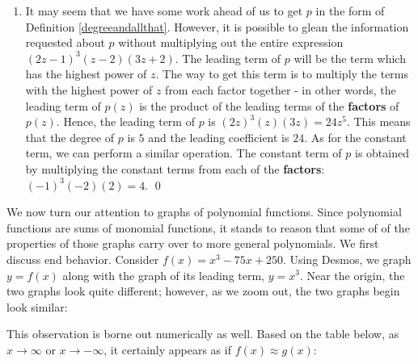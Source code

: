 \documentclass{ximera}
\begin{document}
\begin{example}
\begin{enumerate}
\item  It may seem that we have some work ahead of us to get $p$ in the form of Definition \ref{degreeandallthat}.  However, it is possible to glean the information requested about $p$ without multiplying out the entire expression $(2z-1)^{3}(z-2)(3z+2)$.  The leading term of $p$ will be the term which has the highest power of $z$.  The way to get this term  is to multiply the terms with the highest power of $z$ from each factor together - in other words, the leading term of $p(z)$ is the product of the leading terms of the \textbf{factors} of $p(z)$.  Hence, the leading term of $p$ is $(2z)^3(z)(3z) =  24z^5$.  This means that the degree of $p$ is $5$ and the leading coefficient is $24$.  As for the constant term, we can perform a similar operation.  The constant term  of $p$ is obtained by multiplying the constant terms from each of the \textbf{factors}: $(-1)^3(-2)(2) = 4$.  \qed

\end{enumerate}

\end{example}


We now turn our attention to graphs of polynomial functions. Since polynomial functions are sums of monomial functions, it stands to reason that some of of the properties of those graphs carry over to more general polynomials. We first discuss end behavior.  Consider $f(x) = x^3-75x+250$.  Using Desmos, we graph $y = f(x)$ along with the graph of its leading term, $y = x^3$. Near the origin, the two graphs look quite different; however, as we zoom out, the two graphs begin look similar:


\begin{center}
\end{center}



This observation is borne out numerically as well.  Based on the table below, as $x \rightarrow \infty$ or $x \rightarrow -\infty$, it certainly appears as if $f(x) \approx g(x)$:
\end{document}
